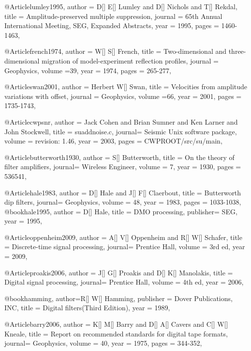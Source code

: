 {@Article{lumley1995,
  author = 	 {D[] E[] Lumley and D[] Nichols and T[] Rekdal},
  title = 	 {Amplitude-preserved multiple suppression},
  journal = 	 {65th Annual International Meeting, SEG, Expanded Abstracts},
  year = 	 1995,
  pages =	 {1460-1463},
}

@Article{french1974,
  author = 	 {W[] S[] French},
  title = 	 {Two-dimensional and three-dimensional migration of model-experiment reflection profiles},
  journal = 	 {Geophysics},
  volume ={39},
  year = 	 1974,
  pages =	 {265-277},
}

@Article{swan2001,
  author = 	 {Herbert W[] Swan},
  title = 	 {Velocities from amplitude variations with offset},
  journal = 	 {Geophysics},
  volume ={66},
  year = 	 2001,
  pages =	 {1735-1743},
}

@Article{cwpsnr,
  author = 	 {Jack Cohen and Brian Sumner and Ken Larner and John Stockwell},
  title  = 	 {suaddnoise.c},
  journal= 	 {Seismic Unix software package},
  volume =	 {revision: 1.46},
  year   = 	 2003,
  pages  =	 {CWPROOT/src/su/main},
}

@Article{butterworth1930,
  author = 	 {S[] Butterworth},
  title  = 	 {On the theory of filter amplifiers},
  journal= 	 {Wireless Engineer},
  volume =	 {7},
  year   = 	 1930,
  pages  =	 {536541},
}

@Article{hale1983,
  author = 	 {D[] Hale and J[] F[] Claerbout},
  title  = 	 {Butterworth dip filters},
  journal= 	 {Geophysics},
  volume =	 {48},
  year   = 	 1983,
  pages  =	 {1033-1038},
}
@book{hale1995,
  author = 	 {D[] Hale},
  title  = 	 {DMO processing},
  publisher= 	 {SEG},
  year   = 	 1995,
}

@Article{oppenheim2009,
  author = 	 {A[] V[] Oppenheim and R[] W[] Schafer},
  title  = 	 {Discrete-time signal processing},
  journal= 	 {Prentice Hall},
  volume =	 {3rd ed},
  year   = 	 2009,
}

@Article{proakis2006,
  author = 	 {J[] G[] Proakis and D[] K[] Manolakis},
  title  = 	 {Digital signal processing},
  journal= 	 {Prentice Hall},
  volume =	 {4th ed},
  year   = 	 2006,
}

@book{hamming,
  author={R[] W[] Hamming},
  publisher = {Dover Publications, INC},
  title = {Digital filters(Third Edition)},
  year = {1989},
}

@Article{barry2006,
  author = 	 {K[] M[] Barry and D[] A[] Cavers and C[] W[] Kneale},
  title  = 	 {Report on recommended standards for digital tape formats},
  journal= 	 {Geophysics},
  volume =	 {40},
  year   = 	 1975,
  pages  = 	 344-352,
}

}
